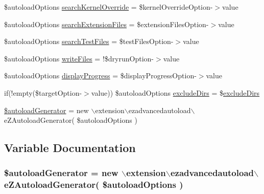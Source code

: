 \begin{DoxyCompactItemize}
\item 
\$autoload\-Options \hyperlink{ezpgenerateautoloads_8php_af86b9a19664645803f32b4d5bb872ff1}{search\-Kernel\-Override} = \$kernel\-Override\-Option-\/$>$value
\item 
\$autoload\-Options \hyperlink{ezpgenerateautoloads_8php_ae648f5335e57fa264ffaaf9d2fe4c61b}{search\-Extension\-Files} = \$extension\-Files\-Option-\/$>$value
\item 
\$autoload\-Options \hyperlink{ezpgenerateautoloads_8php_a3727c480754aa7c8b3dc7e8070ed1eb4}{search\-Test\-Files} = \$test\-Files\-Option-\/$>$value
\item 
\$autoload\-Options \hyperlink{ezpgenerateautoloads_8php_a210f8683b204a76199152312e3d9a177}{write\-Files} = !\$dryrun\-Option-\/$>$value
\item 
\$autoload\-Options \hyperlink{ezpgenerateautoloads_8php_aa79f55582aba2bd3eff4d3fa4b980a84}{display\-Progress} = \$display\-Progress\-Option-\/$>$value
\item 
if(!empty(\$target\-Option-\/$>$value)) \*
\$autoload\-Options \hyperlink{ezpgenerateautoloads_8php_a52217447e9aa7d329a16ea69370b42a4}{exclude\-Dirs} = \$\hyperlink{ezpgenerateautoloads_8php_a52217447e9aa7d329a16ea69370b42a4}{exclude\-Dirs}
\item 
\hyperlink{ezpgenerateautoloads_8php_a86e95d193d321273aadaef08750683a8}{\$autoload\-Generator} = new $\backslash$extension$\backslash$ezadvancedautoload$\backslash$e\-Z\-Autoload\-Generator( \$autoload\-Options )
\end{DoxyCompactItemize}


\subsection{\-Variable \-Documentation}
\hypertarget{ezpgenerateautoloads_8php_a86e95d193d321273aadaef08750683a8}{
\subsubsection[{\$autoload\-Generator}]{\setlength{\rightskip}{0pt plus 5cm}\$autoload\-Generator = new $\backslash$extension$\backslash$ezadvancedautoload$\backslash$e\-Z\-Autoload\-Generator( \$autoload\-Options )}}\label{ezpgenerateautoloads_8php_a86e95d193d321273aadaef08750683a8}


